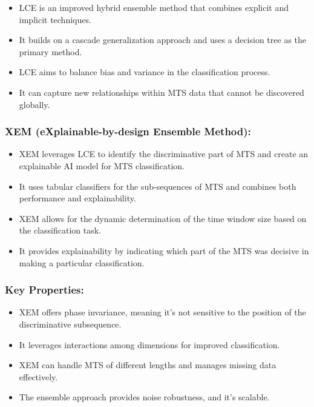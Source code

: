 \documentclass{article}
\begin{document}
\begin{itemize}

    \item LCE is an improved hybrid ensemble method that combines explicit and implicit techniques.

    \item It builds on a cascade generalization approach and uses a decision tree as the primary method.

    \item LCE aims to balance bias and variance in the classification process.

    \item It can capture new relationships within MTS data that cannot be discovered globally.

\end{itemize}

\subsubsection{XEM (eXplainable-by-design Ensemble Method):}

\begin{itemize}

    \item XEM leverages LCE to identify the discriminative part of MTS and create an explainable AI model for MTS classification.

    \item It uses tabular classifiers for the sub-sequences of MTS and combines both performance and explainability.

    \item XEM allows for the dynamic determination of the time window size based on the classification task.

    \item It provides explainability by indicating which part of the MTS was decisive in making a particular classification.

\end{itemize}

\subsubsection{Key Properties:}

\begin{itemize}

    \item XEM offers phase invariance, meaning it's not sensitive to the position of the discriminative subsequence.

    \item It leverages interactions among dimensions for improved classification.

    \item XEM can handle MTS of different lengths and manages missing data effectively.

    \item The ensemble approach provides noise robustness, and it's scalable.

\end{itemize}
\end{document}
